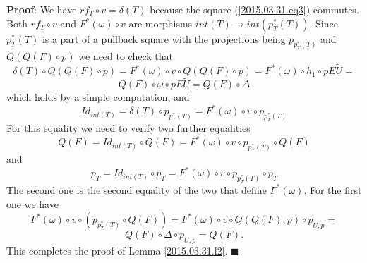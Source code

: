 \documentclass[12pt]{article}
\numberwithin{equation}{section}
\newenvironment{myproof}{{\bf Proof}:}{$\blacksquare$ \vskip 5mm }
\newcommand{\sr}{\rightarrow}
\newcommand{\wt}{\widetilde}
\begin{document}
\begin{myproof}
We have $rf_T\circ v=\delta(T)$ because the square (\ref{2015.03.31.eq3})
commutes.  Both $rf_T\circ v$ and $F^*(\omega)\circ v$ are morphisms $int(T)\sr
int(p_T^*(T))$. Since $p_T^*(T)$ is a part of a pullback square with the
projections being $p_{p_T^*(T)}$ and $Q(Q(F)\circ p)$ we need to check that
%
$$\delta(T)\circ Q(Q(F)\circ p)= F^*(\omega)\circ v\circ Q(Q(F)\circ
p)=F^*(\omega)\circ h_1\circ pE\wt{U}=$$
$$Q(F)\circ \omega \circ pE\wt{U}=Q(F)\circ \Delta$$
%
which holds by a simple computation, and
%
$$Id_{int(T)}=\delta(T)\circ p_{p_T^*(T)}=F^*(\omega)\circ v\circ
p_{p_T^*(T)}$$
%
For this equality we need to verify two further equalities
%
$$Q(F)=Id_{int(T)}\circ Q(F)=F^*(\omega)\circ v\circ p_{p_T^*(T)}\circ Q(F)$$
%
and
%
$$p_T=Id_{int(T)}\circ p_T=F^*(\omega)\circ v\circ p_{p_T^*(T)}\circ p_T$$
%
The second one is the second equality of the two that define $F^*(\omega)$. For
the first one we have
%
$$F^*(\omega)\circ v\circ (p_{p_T^*(T)}\circ Q(F))=F^*(\omega)\circ v\circ
Q(Q(F),p)\circ p_{\wt{U},p}=$$
$$Q(F)\circ \Delta\circ p_{\wt{U},p}=Q(F).$$
%
This completes the proof of Lemma \ref{2015.03.31.l2}.
\end{myproof}
%
 
\end{document}
